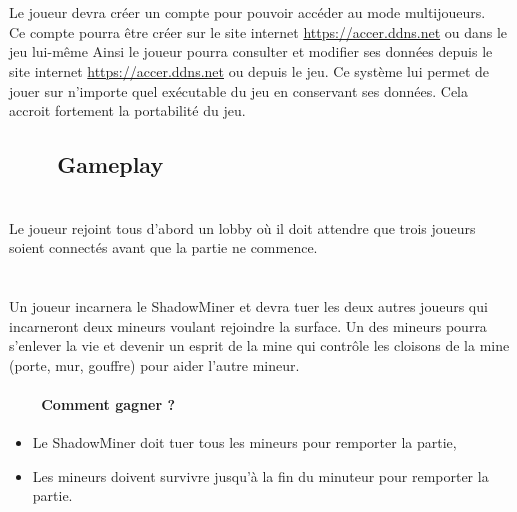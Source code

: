 \documentclass[titlepage, 13px, a4paper]{report}
\begin{document}
\paragraph{} \hspace{0pt} \\
Le joueur devra créer un compte pour pouvoir accéder au mode multijoueurs. \\
Ce compte pourra être créer sur le site internet \url{https://accer.ddns.net} ou dans le jeu lui-même Ainsi le joueur pourra 
consulter et modifier ses données depuis le site internet \url{https://accer.ddns.net} ou depuis le jeu. Ce système lui permet 
de jouer sur n’importe quel exécutable du jeu en conservant ses données. 
Cela accroit fortement la portabilité du jeu. \\

\subsection[Gameplay]{~~~~Gameplay}
\paragraph{} \hspace{0pt} \\
Le joueur rejoint tous d’abord un lobby où il doit attendre que trois joueurs 
soient connectés avant que la partie ne commence.

\paragraph{} \hspace{0pt} \\
Un joueur incarnera le ShadowMiner et devra tuer les deux autres joueurs qui 
incarneront deux mineurs voulant rejoindre la surface. Un des mineurs pourra 
s’enlever la vie et devenir un esprit de la mine qui contrôle les cloisons de 
la mine (porte, mur, gouffre) pour aider l’autre mineur. \\

\paragraph{~~~~Comment gagner ?} \hspace{0pt}
{\begin{itemize}
	\item Le ShadowMiner doit tuer tous les mineurs pour remporter la partie,
	\item Les mineurs doivent survivre jusqu’à la fin du minuteur pour remporter la partie. \\
\end{itemize}}
\end{document}
